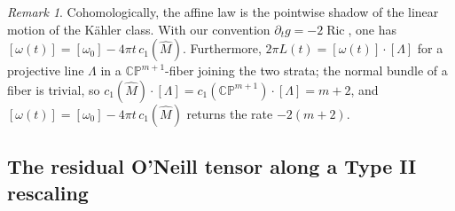\documentclass[11pt]{amsart}
\theoremstyle{plain}
\numberwithin{equation}{section}
\theoremstyle{definition}
\theoremstyle{remark}
\newtheorem*{remarkx}{Remark}
\begin{document}
\begin{remarkx}
		
		Cohomologically, the affine law is the pointwise shadow of the linear motion of the Kähler class. With our convention $\partial_t g = -2 \operatorname{Ric}$, one has $[ \omega(t) ] = [ \omega_0 ] - 4 \pi t\, c_1 ( \widehat{M} )$. Furthermore, $2 \pi L (t) = [ \omega (t) ] \cdot [ \Lambda ]$ for a projective line $\Lambda$ in a $\mathbb{CP}^{m+1}$-fiber joining the two strata; the normal bundle of a fiber is trivial, so $c_1 ( \widehat{M} ) \cdot [ \Lambda ] = c_1 ( \mathbb{CP}^{m+1} ) \cdot [ \Lambda ] = m + 2$, and $[ \omega (t) ] = [ \omega_0 ] - 4 \pi t\, c_1 ( \widehat{M} )$ returns the rate $- 2 ( m + 2 )$. %
		
\end{remarkx}
\subsection{The residual O'Neill tensor along a Type II rescaling}\label{subsec:A-residual-decay}

\end{document}
